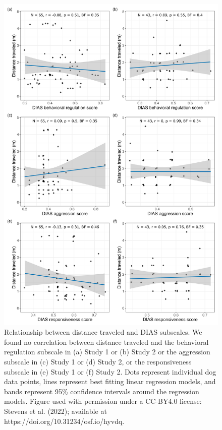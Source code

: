 \documentclass[
  pub,floatsintext]{apa6}
\begin{document}
\clearpage

\begin{figure}

{\centering \includegraphics[width=0.75\linewidth]{figures/distance_dias_subscales} 

}

\caption{Relationship between distance traveled and DIAS subscales. We found no correlation between distance traveled and the behavioral regulation subscale in (a) Study 1 or (b) Study 2 or the aggression subscale in (c) Study 1 or (d) Study 2, or the responsiveness subscale in (e) Study 1 or (f) Study 2. Dots represent individual dog data points, lines represent best fitting linear regression models, and bands represent 95\% confidence intervals around the regression models.  Figure used with permission under a CC-BY4.0 license: Stevens et al. (2022); available at https://doi.org/10.31234/osf.io/hyvdq.}\label{fig:dias-all}
\end{figure}
\end{document}
